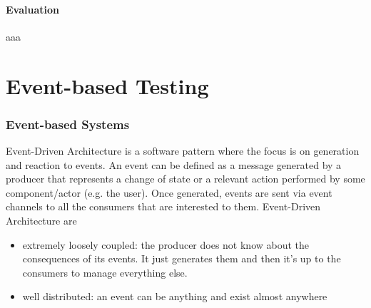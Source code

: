 \documentclass[11pt,a4paper,notitlepage]{article}
\begin{document}
\subsection{Evaluation}

aaa


\part{Event-based Testing}

\section{Event-based Systems}
Event-Driven Architecture is a software pattern where the focus is on generation and reaction to events. An event can be defined as a message generated by a producer that represents a change of state or a relevant action performed by some component/actor (e.g. the user). Once generated, events are sent via event channels to all the consumers that are interested to them. Event-Driven Architecture are
\begin{itemize}
	\item extremely loosely coupled: the producer does not know about the consequences of its events. It just generates them and then it's up to the consumers to manage everything else.
	\item well distributed: an event can be anything and exist almost anywhere
\end{itemize}
\end{document}
